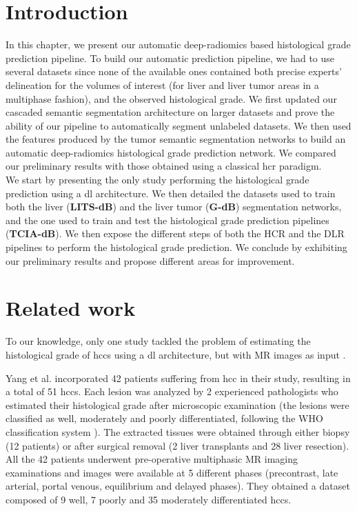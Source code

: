 \documentclass[]{article}
\newcommand{\lmttfont}[1]{{\fontfamily{lmtt}\selectfont #1}}
\begin{document}
\section{Introduction}


In this chapter, we present our automatic deep-radiomics based histological grade prediction pipeline. To build our automatic prediction pipeline, we had to use several datasets since none of the available ones contained both precise experts' delineation for the volumes of interest (for liver and liver tumor areas in a multiphase fashion), and the observed histological grade.
We first updated our cascaded semantic segmentation architecture on larger datasets and prove the ability of our pipeline to automatically segment unlabeled datasets. We then used the features produced by the tumor semantic segmentation networks to build an automatic deep-radiomics histological grade prediction network. We compared our preliminary results with those obtained using a classical \ac{hcr} paradigm. \\
We start by presenting the only study performing the histological grade prediction using a \ac{dl} architecture. We then detailed the datasets used to train both the liver (\textbf{\lmttfont{LITS-dB}}) and the liver tumor (\textbf{\lmttfont{G-dB}}) segmentation networks, and the one used to train and test the histological grade prediction pipelines (\textbf{\lmttfont{TCIA-dB}}). We then expose the different steps of both the HCR and the DLR pipelines to perform the histological grade prediction. We conclude by exhibiting our preliminary results and propose different areas for improvement.

\section{Related work}

To our knowledge, only one study tackled the problem of estimating the
histological grade of \ac{hcc}s using a \ac{dl} architecture, but with MR images
as input \cite{Yang2019}.

Yang et al. incorporated 42 patients suffering from \ac{hcc} in their study,
resulting in a total of 51 \ac{hcc}s. Each lesion was analyzed by 2
experienced pathologists who estimated their histological grade after
microscopic examination (the lesions were classified as well, moderately
and poorly differentiated, following the WHO classification system \cite{20113051318}).
The extracted tissues were obtained through either biopsy (12 patients)
or after surgical removal (2 liver transplants and 28 liver resection).
All the 42 patients underwent pre-operative multiphasic MR imaging
examinations and images were available at 5 different phases
(precontrast, late arterial, portal venous, equilibrium and delayed
phases). They obtained a dataset composed of 9 well, 7 poorly and 35 moderately
differentiated \ac{hcc}s.
\end{document}
